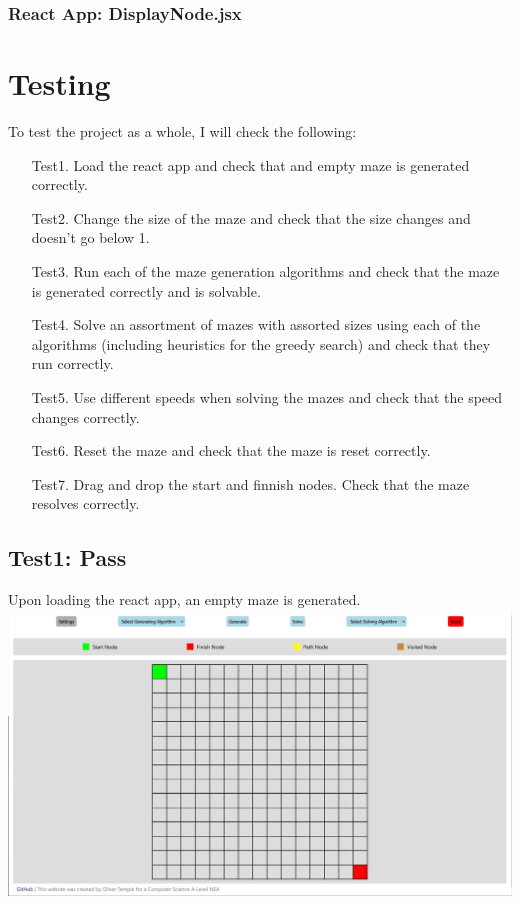 \documentclass[titlepage]{article}
\begin{document}
\subsubsection{React App: DisplayNode.jsx}


\section{Testing}
To test the project as a whole, I will check the following:
\begin{enumerate}
    \item[Test1.] Load the react app and check that and empty maze is generated correctly.
    \item[Test2.] Change the size of the maze and check that the size changes and doesn't go below 1.
    \item[Test3.] Run each of the maze generation algorithms and check that the maze is generated correctly and is solvable.
    \item[Test4.] Solve an assortment of mazes with assorted sizes using each of the algorithms (including heuristics for the greedy search) and check that they run correctly.
    \item[Test5.] Use different speeds when solving the mazes and check that the speed changes correctly.
    \item[Test6.] Reset the maze and check that the maze is reset correctly.
    \item[Test7.] Drag and drop the start and finnish nodes. Check that the maze resolves correctly. 
\end{enumerate}

\subsection{Test1: Pass}
Upon loading the react app, an empty maze is generated.
\newline
\includegraphics[width=\linewidth]{assets/testing/test1.jpg}
\end{document}
